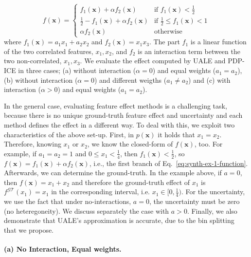 \documentclass[twoside]{article}
\newcommand{\xb}{\mathbf{x}}
\begin{document}
\begin{equation}
  \label{eq:synth-ex-1-function}
  f(\mathbf{x}) = \begin{cases}
                    f_1(\mathbf{x}) + \alpha f_2(\mathbf{x}) & \text{if $f_1(\mathbf{x}) < \frac{1}{2}$ }\\
                    \frac{1}{2} - f_1(\mathbf{x}) + \alpha f_2(\mathbf{x}) & \text{if $\frac{1}{2} \leq f_1(\mathbf{x}) < 1$}\\
                    \alpha f_2(\mathbf{x}) &\text{otherwise}
                  \end{cases}
\end{equation}
%
where \(f_1(\mathbf{x}) = a_1 x_1 + a_2 x_2\) and
\(f_2(\mathbf{x}) = x_1x_3\). The part \(f_1\) is a linear function of
the two correlated features, \(x_1, x_2\), and \(f_2\) is an
interaction term between the two non-correlated, \(x_1, x_3\).  We
evaluate the effect computed by UALE and PDP-ICE in three cases; (a)
without interaction (\(\alpha=0\)) and equal weights (\(a_1=a_2\)),
(b) without interaction (\(\alpha=0\)) and different weigths
(\( a_1 \neq a_2 \)) and (c) with interaction (\(\alpha > 0\)) and
equal weights (\(a_1=a_2\)).

In the general case, evaluating feature effect methods is a
challenging task, because there is no unique ground-truth feature
effect and uncertainty and each method defines the effect in a
different way. To deal with this, we exploit two characteristics of
the above set-up. First, in \(p(\xb)\) it holds that
\(x_1=x_2\). Therefore, knowing \(x_1\) or \(x_2\), we know the
closed-form of \(f(\xb)\), too. For example, if \(a_1=a_2=1\) and
\( 0 \leq x_1 < \frac{1}{4}\), then \(f_1(\xb) < \frac{1}{2}\), so
\(f(\xb) = f_1(\xb) + \alpha f_2(\xb) \), i.e., the first branch of
Eq.~\ref{eq:synth-ex-1-function}. Afterwards, we can determine the
ground-truth. In the example above, if \(a=0\), then
\(f(\xb) = x_1 + x_2\) and therefore the ground-truth effect of
\(x_1\) is \(f^{\mathcal{GT}}(x_1) = x_1\) in the corresponding
interval, i.e. \(x_1 \in [0, \frac{1}{4})\). For the uncertainty, we
use the fact that under no-interactions, \(a=0\), the uncertainty must
be zero (no heteregoneity). We discuss separately the case with
\(a>0\). Finally, we also demonstrate that UALE's approximation is
accurate, due to the bin splitting that we propose.

\paragraph{(a) No Interaction, Equal weights.}
\end{document}
